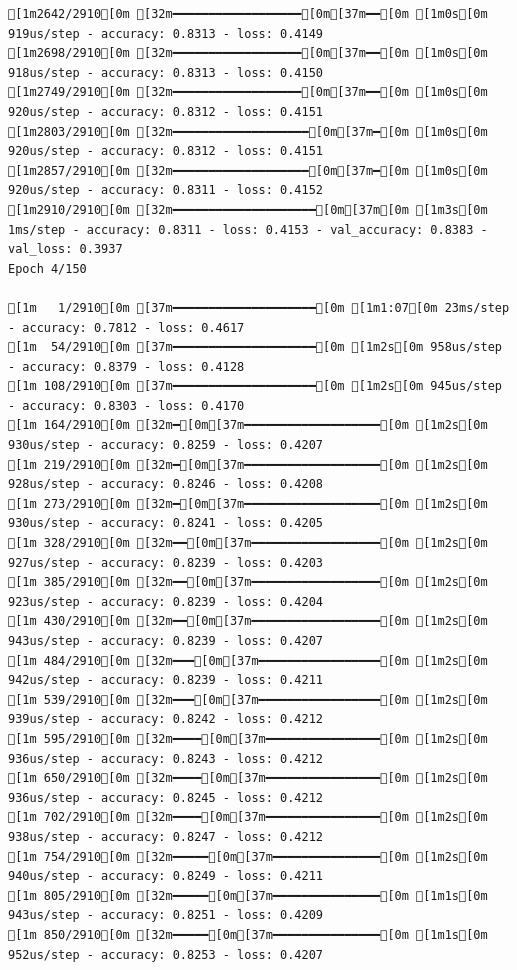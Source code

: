 \documentclass[
  letterpaper,
  DIV=11,
  numbers=noendperiod]{scrartcl}
\begin{document}
\begin{verbatim}
[1m2642/2910[0m [32m━━━━━━━━━━━━━━━━━━[0m[37m━━[0m [1m0s[0m 919us/step - accuracy: 0.8313 - loss: 0.4149
[1m2698/2910[0m [32m━━━━━━━━━━━━━━━━━━[0m[37m━━[0m [1m0s[0m 918us/step - accuracy: 0.8313 - loss: 0.4150
[1m2749/2910[0m [32m━━━━━━━━━━━━━━━━━━[0m[37m━━[0m [1m0s[0m 920us/step - accuracy: 0.8312 - loss: 0.4151
[1m2803/2910[0m [32m━━━━━━━━━━━━━━━━━━━[0m[37m━[0m [1m0s[0m 920us/step - accuracy: 0.8312 - loss: 0.4151
[1m2857/2910[0m [32m━━━━━━━━━━━━━━━━━━━[0m[37m━[0m [1m0s[0m 920us/step - accuracy: 0.8311 - loss: 0.4152
[1m2910/2910[0m [32m━━━━━━━━━━━━━━━━━━━━[0m[37m[0m [1m3s[0m 1ms/step - accuracy: 0.8311 - loss: 0.4153 - val_accuracy: 0.8383 - val_loss: 0.3937
Epoch 4/150

[1m   1/2910[0m [37m━━━━━━━━━━━━━━━━━━━━[0m [1m1:07[0m 23ms/step - accuracy: 0.7812 - loss: 0.4617
[1m  54/2910[0m [37m━━━━━━━━━━━━━━━━━━━━[0m [1m2s[0m 958us/step - accuracy: 0.8379 - loss: 0.4128 
[1m 108/2910[0m [37m━━━━━━━━━━━━━━━━━━━━[0m [1m2s[0m 945us/step - accuracy: 0.8303 - loss: 0.4170
[1m 164/2910[0m [32m━[0m[37m━━━━━━━━━━━━━━━━━━━[0m [1m2s[0m 930us/step - accuracy: 0.8259 - loss: 0.4207
[1m 219/2910[0m [32m━[0m[37m━━━━━━━━━━━━━━━━━━━[0m [1m2s[0m 928us/step - accuracy: 0.8246 - loss: 0.4208
[1m 273/2910[0m [32m━[0m[37m━━━━━━━━━━━━━━━━━━━[0m [1m2s[0m 930us/step - accuracy: 0.8241 - loss: 0.4205
[1m 328/2910[0m [32m━━[0m[37m━━━━━━━━━━━━━━━━━━[0m [1m2s[0m 927us/step - accuracy: 0.8239 - loss: 0.4203
[1m 385/2910[0m [32m━━[0m[37m━━━━━━━━━━━━━━━━━━[0m [1m2s[0m 923us/step - accuracy: 0.8239 - loss: 0.4204
[1m 430/2910[0m [32m━━[0m[37m━━━━━━━━━━━━━━━━━━[0m [1m2s[0m 943us/step - accuracy: 0.8239 - loss: 0.4207
[1m 484/2910[0m [32m━━━[0m[37m━━━━━━━━━━━━━━━━━[0m [1m2s[0m 942us/step - accuracy: 0.8239 - loss: 0.4211
[1m 539/2910[0m [32m━━━[0m[37m━━━━━━━━━━━━━━━━━[0m [1m2s[0m 939us/step - accuracy: 0.8242 - loss: 0.4212
[1m 595/2910[0m [32m━━━━[0m[37m━━━━━━━━━━━━━━━━[0m [1m2s[0m 936us/step - accuracy: 0.8243 - loss: 0.4212
[1m 650/2910[0m [32m━━━━[0m[37m━━━━━━━━━━━━━━━━[0m [1m2s[0m 936us/step - accuracy: 0.8245 - loss: 0.4212
[1m 702/2910[0m [32m━━━━[0m[37m━━━━━━━━━━━━━━━━[0m [1m2s[0m 938us/step - accuracy: 0.8247 - loss: 0.4212
[1m 754/2910[0m [32m━━━━━[0m[37m━━━━━━━━━━━━━━━[0m [1m2s[0m 940us/step - accuracy: 0.8249 - loss: 0.4211
[1m 805/2910[0m [32m━━━━━[0m[37m━━━━━━━━━━━━━━━[0m [1m1s[0m 943us/step - accuracy: 0.8251 - loss: 0.4209
[1m 850/2910[0m [32m━━━━━[0m[37m━━━━━━━━━━━━━━━[0m [1m1s[0m 952us/step - accuracy: 0.8253 - loss: 0.4207

\end{verbatim}
\end{document}
